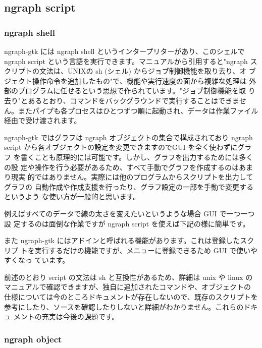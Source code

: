 \documentclass[mingoth,a4paper,twoside]{jsarticle}
\begin{document}
\subsection{ngraph script}
\subsubsection{ngraph shell}

ngraph-gtk には ngraph shell というインタープリターがあり、このシェルで
ngraph script という言語を実行できます。マニュアルから引用すると"ngraph
スクリプトの文法は、UNIXの sh (シェル) からジョブ制御機能を取り去り、オ
ブジェクト操作命令を追加したもの"で、機能や実行速度の面から複雑な処理は
外部のプログラムに任せるという思想で作られています。"ジョブ制御機能を取
り去り"とあるとおり、コマンドをバックグラウンドで実行することはできませ
ん。またパイプも各プロセスはひとつずつ順に起動され、データは作業ファイル
経由で受け渡されます。

ngraph-gtk  ではグラフは  ngraph  オブジェクトの集合で構成されており  ngraph
script から各オブジェクトの設定を変更できますのでGUI を全く使わずにグラフ
を書くことも原理的には可能です。しかし、グラフを出力するためには多くの設
定や操作を行う必要があるため、すべて手動でグラフを作成するのはあまり現実
的ではありません。実際には他のプログラムからスクリプトを出力してグラフの
自動作成や作成支援を行ったり、グラフ設定の一部を手動で変更するというよう
な使い方が一般的と思います。

例えばすべてのデータで線の太さを変えたいというような場合 GUI で一つ一つ設
定するのは面倒な作業ですが ngraph script を使えば下記の様に簡単です。

また ngraph-gtk にはアドインと呼ばれる機能があります。これは登録したスクリプ
トを実行するだけの機能ですが、メニューに登録できるため GUI で使いやすくなっ
ています。

前述のとおり script の文法は sh と互換性があるため、詳細は unix や linux
のマニュアルで確認できますが、独自に追加されたコマンドや、オブジェクトの
仕様については今のところドキュメントが存在しないので、既存のスクリプトを
参考にしたり、ソースを確認したりしないと詳細がわかりません。これらのドキュ
メントの充実は今後の課題です。

\subsubsection{ngraph object}
\end{document}
